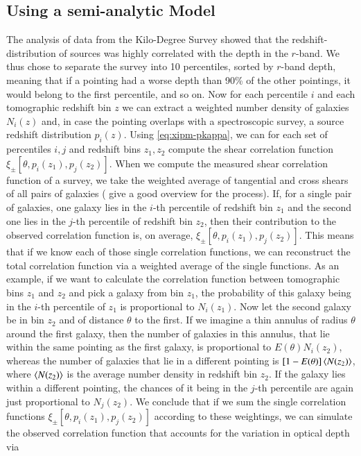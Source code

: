 \subsection{Using a semi-analytic Model}
The analysis of data from the Kilo-Degree Survey showed that the redshift-distribution of sources was highly correlated with the depth in the $r$-band. We thus chose to separate the survey into 10 percentiles, sorted by $r$-band depth, meaning that if a pointing had a worse depth than 90\% of the other pointings, it would belong to the first percentile, and so on. Now for each percentile $i$ and each tomographic redshift bin $z$ we can extract a weighted number density of galaxies $N_i(z)$ and, in case the pointing overlaps with a spectroscopic survey, a source redshift distribution $p_i(z)$. Using \eqref{eq:xipm-pkappa}, we can for each set of percentiles $i,j$ and redshift bins $z_1,z_2$ compute the shear correlation function $\xi_\pm[\theta,p_i(z_1),p_j(z_2)]$. When we compute the measured shear correlation function of a survey, we take the weighted average of tangential and cross shears of all pairs of galaxies (\citet{2017MNRAS.465.1454H} give a good overview for the process). If, for a single pair of galaxies, one galaxy lies in the $i$-th percentile of redshift bin $z_1$ and the second one lies in the $j$-th percentile of redshift bin $z_2$, then their contribution to the observed correlation function is, on average, $\xi_\pm[\theta,p_i(z_1),p_j(z_2)]$. This means that if we know each of those single correlation functions, we can reconstruct the total correlation function via a weighted average of the single functions. As an example, if we want to calculate the correlation function between tomographic bins $z_1$ and $z_2$ and pick a galaxy from bin $z_1$, the probability of this galaxy being in the $i$-th percentile of $z_1$ is proportional to $N_i(z_1)$. Now let the second galaxy be in bin $z_2$ and of distance $\theta$ to the first. If we imagine a thin annulus of radius $\theta$ around the first galaxy, then the number of galaxies in this annulus, that lie within the same pointing as the first galaxy, is proportional to $E(\theta)N_i(z_2)$, whereas the number of galaxies that lie in a different pointing is $[1-E(\theta)]\left< N(z_2)\right>$, where $\left< N(z_2)\right>$ is the average number density in redshift bin $z_2$. If the galaxy lies within a different pointing, the chances of it being in the $j$-th percentile are again just proportional to $N_j(z_2)$. We conclude that if we sum the single correlation functions $\xi_\pm[\theta,p_i(z_1),p_j(z_2)]$ according to these weightings, we can simulate the observed correlation function that accounts for the variation in optical depth via 

